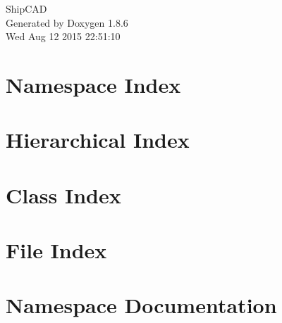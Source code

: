 \documentclass[twoside]{book}
\newcommand{\clearemptydoublepage}{%
  \newpage{\pagestyle{empty}\cleardoublepage}%
}
\begin{document}
\hypersetup{pageanchor=false}
\begin{titlepage}
\vspace*{7cm}
\begin{center}%
{\Large Ship\-C\-A\-D }\\
\vspace*{1cm}
{\large Generated by Doxygen 1.8.6}\\
\vspace*{0.5cm}
{\small Wed Aug 12 2015 22:51:10}\\
\end{center}
\end{titlepage}
\clearemptydoublepage
\tableofcontents
\clearemptydoublepage
{}
\hypersetup{pageanchor=true}

\chapter{Namespace Index}

\chapter{Hierarchical Index}

\chapter{Class Index}

\chapter{File Index}

\chapter{Namespace Documentation}


\end{document}
